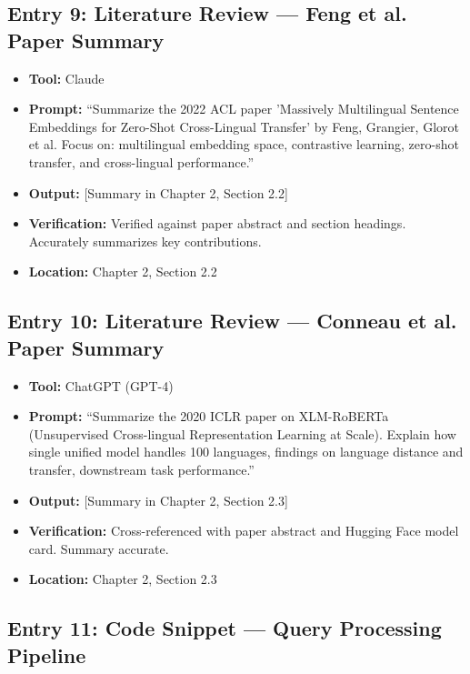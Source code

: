 \documentclass[12pt,a4paper]{report}
\begin{document}
\subsection{Entry 9: Literature Review --- Feng et al. Paper Summary}

\begin{itemize}
    \item \textbf{Tool:} Claude
    \item \textbf{Prompt:} ``Summarize the 2022 ACL paper 'Massively Multilingual Sentence Embeddings for Zero-Shot Cross-Lingual Transfer' by Feng, Grangier, Glorot et al. Focus on: multilingual embedding space, contrastive learning, zero-shot transfer, and cross-lingual performance.''
    \item \textbf{Output:} [Summary in Chapter 2, Section 2.2]
    \item \textbf{Verification:} Verified against paper abstract and section headings. Accurately summarizes key contributions.
    \item \textbf{Location:} Chapter 2, Section 2.2
\end{itemize}

\subsection{Entry 10: Literature Review --- Conneau et al. Paper Summary}

\begin{itemize}
    \item \textbf{Tool:} ChatGPT (GPT-4)
    \item \textbf{Prompt:} ``Summarize the 2020 ICLR paper on XLM-RoBERTa (Unsupervised Cross-lingual Representation Learning at Scale). Explain how single unified model handles 100 languages, findings on language distance and transfer, downstream task performance.''
    \item \textbf{Output:} [Summary in Chapter 2, Section 2.3]
    \item \textbf{Verification:} Cross-referenced with paper abstract and Hugging Face model card. Summary accurate.
    \item \textbf{Location:} Chapter 2, Section 2.3
\end{itemize}

\subsection{Entry 11: Code Snippet --- Query Processing Pipeline}
\end{document}
